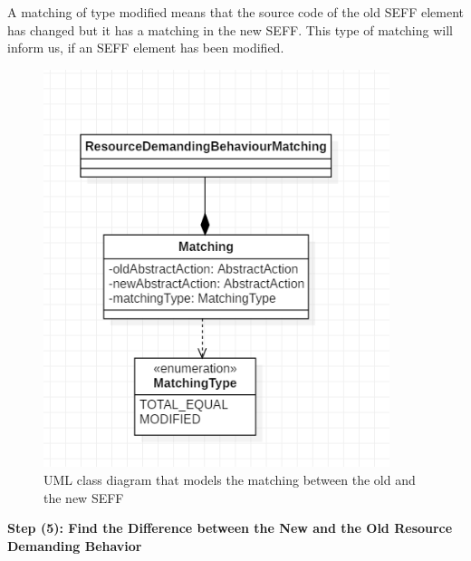 A matching of type modified means that the source code of the old SEFF element has changed but it has a matching in the new SEFF. This type of matching will inform us, if an SEFF element has been modified.\\

\begin{figure}[h]
\centering
\includegraphics[width=0.9\textwidth]{figures/seffmachting}
\caption{UML class diagram that models the matching between the old and the new SEFF}
\label{fig:seffmachting}
\end{figure}


\textbf{Step (5): Find the Difference between the New and the Old Resource Demanding Behavior}\\

